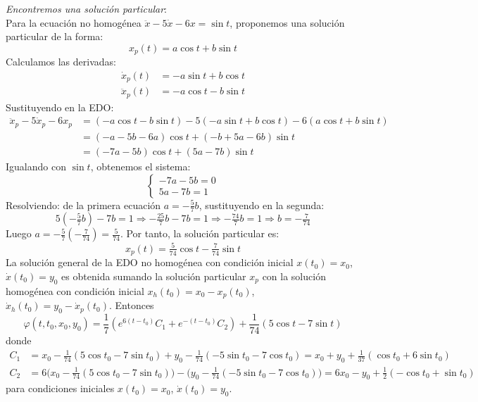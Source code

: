 \begin{sol}
\begin{enumerate}[leftmargin=*, label=(\alph*)]
\emph{Encontremos una solución particular}:\\
Para la ecuación no homogénea $\ddot{x} - 5\dot{x} - 6x = \sin t$, proponemos una solución particular de la forma:
\[
x_p(t) = a\cos t + b\sin t
\]
Calculamos las derivadas:
\begin{align*}
\dot{x}_p(t) &= -a\sin t + b\cos t \\
\ddot{x}_p(t) &= -a\cos t - b\sin t
\end{align*}
Sustituyendo en la EDO:
\begin{align*}
\ddot{x}_p - 5\dot{x}_p - 6x_p &= (-a\cos t - b\sin t) - 5(-a\sin t + b\cos t) - 6(a\cos t + b\sin t) \\
&= (-a - 5b - 6a)\cos t + (-b + 5a - 6b)\sin t \\
&= (-7a - 5b)\cos t + (5a - 7b)\sin t
\end{align*}
Igualando con $\sin t$, obtenemos el sistema:
\[
\begin{cases}
-7a - 5b = 0 \\
5a - 7b = 1
\end{cases}
\]
Resolviendo: de la primera ecuación $a = -\frac{5}{7}b$, sustituyendo en la segunda:
\[
5(-\tfrac{5}{7}b) - 7b = 1 \Rightarrow -\tfrac{25}{7}b - 7b = 1 \Rightarrow -\tfrac{74}{7}b = 1 \Rightarrow b = -\tfrac{7}{74}
\]
Luego $a = -\tfrac{5}{7}(-\tfrac{7}{74}) = \tfrac{5}{74}$. Por tanto, la solución particular es:
\[
x_p(t) = \tfrac{5}{74}\cos t - \tfrac{7}{74}\sin t
\]
La solución general de la EDO no homogénea con condición inicial $x(t_0) = x_0$, $\dot{x}(t_0) = y_0$ es obtenida sumando la solución particular $x_p$ con la solución homogénea con condición inicial $x_h(t_0) = x_0 - x_p(t_0)$, $\dot{x}_h(t_0) = y_0 - \dot{x}_p(t_0)$. Entonces
\[
\varphi(t,t_0,x_0,y_0) = \frac17\left(e^{6(t-t_0)}C_1 + e^{-(t-t_0)}C_2\right) + \frac{1}{74}(5\cos t - 7\sin t)
\]
donde 
\begin{align*}
C_1 &= x_0 - \tfrac{1}{74}(5\cos t_0 - 7\sin t_0) + y_0 - \tfrac{1}{74}(-5\sin t_0 - 7\cos t_0) = x_0 + y_0 + \tfrac{1}{37}(\cos t_0 + 6\sin t_0)\\
C_2 &= 6\big(x_0 - \tfrac{1}{74}(5\cos t_0 - 7\sin t_0)\big) - \big(y_0 - \tfrac{1}{74}(-5\sin t_0 - 7\cos t_0)\big)= 6x_0 - y_0 + \tfrac{1}{2}(-\cos t_0 + \sin t_0)
\end{align*}
para condiciones iniciales $x(t_0) = x_0$, $\dot{x}(t_0) = y_0$.


\end{enumerate}
\end{sol}
